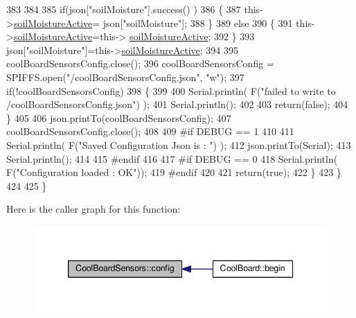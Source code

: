 \begin{DoxyCode}
383 
384             
385             \textcolor{keywordflow}{if}(json[\textcolor{stringliteral}{"soilMoisture"}].success() )
386             \{           
387                 this->\hyperlink{class_cool_board_sensors_ae7971bf527781ac4994309591b78ab89}{soilMoistureActive}= json[\textcolor{stringliteral}{"soilMoisture"}];
388             \}
389             \textcolor{keywordflow}{else}
390             \{
391                 this->\hyperlink{class_cool_board_sensors_ae7971bf527781ac4994309591b78ab89}{soilMoistureActive}=this->
      \hyperlink{class_cool_board_sensors_ae7971bf527781ac4994309591b78ab89}{soilMoistureActive};
392             \}
393             json[\textcolor{stringliteral}{"soilMoisture"}]=this->\hyperlink{class_cool_board_sensors_ae7971bf527781ac4994309591b78ab89}{soilMoistureActive};
394 
395             coolBoardSensorsConfig.close();         
396             coolBoardSensorsConfig = SPIFFS.open(\textcolor{stringliteral}{"/coolBoardSensorsConfig.json"}, \textcolor{stringliteral}{"w"});          
397             \textcolor{keywordflow}{if}(!coolBoardSensorsConfig)
398             \{
399 
400                 Serial.println( F(\textcolor{stringliteral}{"failed to write to /coolBoardSensorsConfig.json"}) );
401                 Serial.println();
402 
403                 \textcolor{keywordflow}{return}(\textcolor{keyword}{false});          
404             \}  
405 
406             json.printTo(coolBoardSensorsConfig);
407             coolBoardSensorsConfig.close();         
408             
409 \textcolor{preprocessor}{        #if DEBUG == 1}
410 
411             Serial.println( F(\textcolor{stringliteral}{"Saved Configuration Json is : "}) );
412             json.printTo(Serial);
413             Serial.println();
414         
415 \textcolor{preprocessor}{        #endif}
416 
417 \textcolor{preprocessor}{        #if DEBUG == 0}
418             Serial.println( F(\textcolor{stringliteral}{"Configuration loaded : OK"}));
419 \textcolor{preprocessor}{        #endif}
420 
421             \textcolor{keywordflow}{return}(\textcolor{keyword}{true}); 
422         \}
423     \}   
424 
425 \}
\end{DoxyCode}
Here is the caller graph for this function\+:\nopagebreak
\begin{figure}[H]
\begin{center}
\leavevmode
\includegraphics[width=339pt]{de/d46/class_cool_board_sensors_a9a218895c5423375c33c08f2c56fb23a_icgraph}
\end{center}
\end{figure}
\mbox{\label{class_cool_board_sensors_a4902b69f6e628bd6557193758fdd2bae}} 
